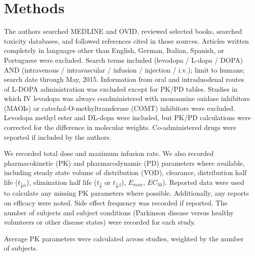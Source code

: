 \section{Methods}
The authors searched MEDLINE and OVID, reviewed selected books, searched toxicity databases, and followed references cited in those sources. Articles written completely in languages other than English, German, Italian, Spanish, or Portuguese were excluded. Search terms included (levodopa / L-dopa / DOPA) AND (intravenous / intravascular / infusion / injection / i.v.); limit to humans; search date through May, 2015. Information from oral and intraduodenal routes of L-DOPA administration was excluded except for PK/PD tables.  Studies in which IV levodopa was always coadministered with monoamine oxidase inhibitors (MAOIs) or catechol-O-methyltransferase (COMT) inhibitors were excluded.  Levodopa methyl ester \cite{3601092} and DL-dopa \cite{14430381} were included, but PK/PD calculations were corrected for the difference in molecular weights.  Co-administered drugs were reported if included by the authors.

We recorded total dose and maximum infusion rate.  We also recorded pharmacokinetic (PK) and pharmacodynamic (PD) parameters where available, including steady state volume of distribution (VOD), clearance, distribution half life ($t_{\frac{1}{2}\alpha}$), elimination half life ($t_{\frac{1}{2}}$ or $t_{\frac{1}{2}\beta}$), $E_{max}$, $EC_{50}$).   Reported data were used to calculate any missing PK parameters where possible.  Additionally, any reports on efficacy were noted.  Side effect frequency was recorded if reported. The number of subjects and subject conditions (Parkinson disease versus healthy volunteers or other disease states) were recorded for each study. 

Average PK parameters were calculated across studies, weighted by the number of subjects.